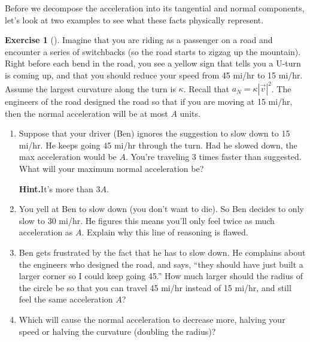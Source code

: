 \documentclass[10pt,]{book}
\theoremstyle{plain}
\theoremstyle{definition}
\theoremstyle{definition}
\theoremstyle{definition}
\theoremstyle{definition}
\newtheorem{exploration}[project]{Exercise}
\theoremstyle{definition}
\numberwithin{equation}{section}
\begin{document}
Before we decompose the acceleration into its tangential and normal components, let's look at two examples to see what these facts physically represent.%
\begin{exploration}[]\label{exploration-181}
Imagine that you are riding as a passenger on a road and encounter a series of switchbacks (so the road starts to zigzag up the mountain). Right before each bend in the road, you see a yellow sign that tells you a U-turn is coming up, and that you should reduce your speed from 45 mi/hr to 15 mi/hr. Assume the largest curvature along the turn is \(\kappa\). Recall that \(a_N=\kappa |\vec v|^2\). The engineers of the road designed the road so that if you are moving at 15 mi/hr, then the normal acceleration will be at most \(A\) units.%
\begin{enumerate}[font=\bfseries,label=(\alph*),ref=\alph*]
\item\label{task-454} Suppose that your driver (Ben) ignores the suggestion to slow down to 15 mi/hr.  He keeps going 45 mi/hr through the turn. Had he slowed down, the max acceleration would be \(A\).  You're traveling 3 times faster than suggested.  What will your maximum normal acceleration be?%
\par\medskip\noindent%
\textbf{Hint.}\quad It's more than \(3A\).%
\item\label{task-455} You yell at Ben to slow down (you don't want to die). So Ben decides to only slow to 30 mi/hr. He figures this means you'll only feel twice as much acceleration as \(A\).  Explain why this line of reasoning is flawed.%
\item\label{task-456} Ben gets frustrated by the fact that he has to slow down. He complains about the engineers who designed the road, and says, ``they should have just built a larger corner so I could keep going 45.''  How much larger should the radius of the circle be so that you can travel 45 mi/hr instead of 15 mi/hr, and still feel the same acceleration \(A\)?%
\item\label{task-457} Which will cause the normal acceleration to decrease more, halving your speed or halving the curvature (doubling the radius)?%
\end{enumerate}
\end{exploration}
\end{document}
